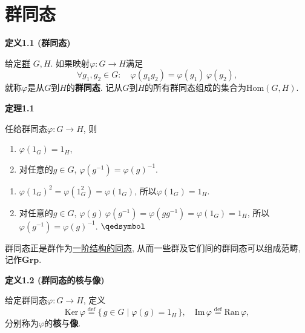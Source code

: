 \documentclass[UTF8]{ctexart}
\begin{document}
\setlength{\abovedisplayskip}{1pt}
\setlength{\belowdisplayskip}{1pt}

\section{群同态}

\hypertarget{sec:定义1.1}{}
\noindent\textbf{定义1.1 (群同态)}

给定\href{01 半群与群#nameddest=sec:定义2.1}{群} $G,H$. 如果映射$\varphi:G\to H$满足
\[
    \forall g_1,g_2\in G:\quad\varphi(g_1g_2)=\varphi(g_1)\,\varphi(g_2),
\]
就称$\varphi$是从$G$到$H$的\textbf{群同态}.
记从$G$到$H$的所有群同态组成的集合为$\mathrm{Hom}(G,H)$.

\vspace{10pt}

\hypertarget{sec:定理1.1}{}
\noindent\textbf{定理1.1}

任给群同态$\varphi:G\to H$, 则
\begin{enumerate}
    \item $\varphi(1_G)=1_H$,
    \item 对任意的$g\in G$, $\varphi(g^{-1})=\varphi(g)^{-1}$.
\end{enumerate}


\begin{enumerate}
    \item $\varphi(1_G)^2=\varphi(1_G^2)=\varphi(1_G)$, 所以$\varphi(1_G)=1_H$.
    \item 对任意的$g\in G$, $\varphi(g)\,\varphi(g^{-1})=\varphi(gg^{-1})
    =\varphi(1_G)=1_H$, 所以$\varphi(g^{-1})=\varphi(g)^{-1}$. \hfill $\qedsymbol$
\end{enumerate}

\vspace{10pt}

群同态正是群作为\href{../../../06 数理逻辑/02 模型论/01 一阶语言的结构/02 结构的同态#nameddest=sec:定义1.1}
{一阶结构的同态}, 从而一些群及它们间的群同态可以组成范畴, 记作$\mathbf{Grp}$.

\vspace{10pt}

\hypertarget{sec:定义1.2}{}
\noindent\textbf{定义1.2 (群同态的核与像)}

给定群同态$\varphi:G\to H$, 定义
\[
    \mathrm{Ker}\,\varphi\overset{\mathrm{def}}{=}\{\,g\in G\mid\varphi(g)=1_H\,\},
    \quad\mathrm{Im}\,\varphi\overset{\mathrm{def}}{=}\mathrm{Ran}\,\varphi,
\]
分别称为$\varphi$的\textbf{核}与\textbf{像}.
\end{document}
